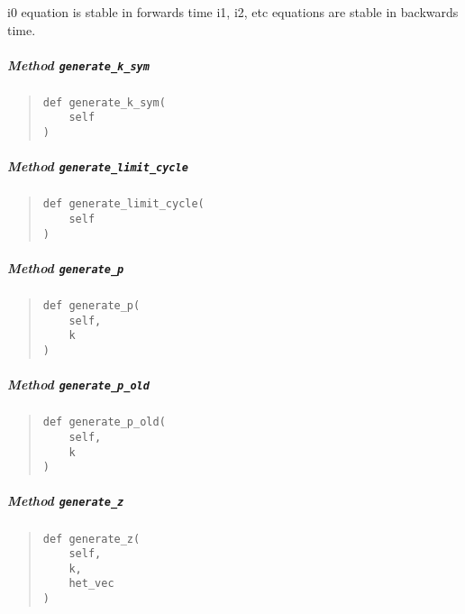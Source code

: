 \documentclass[
  english,
  a4paper,
  oneside]{article}
\begin{document}
i0 equation is stable in forwards time i1, i2, etc equations are stable
in backwards time.

\hypertarget{StrongCoupling.StrongCoupling.generate_k_sym}{%
\subparagraph{\texorpdfstring{Method
\texttt{generate\_k\_sym}}{Method generate\_k\_sym}}\label{StrongCoupling.StrongCoupling.generate_k_sym}}

\begin{quote}
\begin{verbatim}
def generate_k_sym(
    self
)
\end{verbatim}
\end{quote}

\hypertarget{StrongCoupling.StrongCoupling.generate_limit_cycle}{%
\subparagraph{\texorpdfstring{Method
\texttt{generate\_limit\_cycle}}{Method generate\_limit\_cycle}}\label{StrongCoupling.StrongCoupling.generate_limit_cycle}}

\begin{quote}
\begin{verbatim}
def generate_limit_cycle(
    self
)
\end{verbatim}
\end{quote}

\hypertarget{StrongCoupling.StrongCoupling.generate_p}{%
\subparagraph{\texorpdfstring{Method
\texttt{generate\_p}}{Method generate\_p}}\label{StrongCoupling.StrongCoupling.generate_p}}

\begin{quote}
\begin{verbatim}
def generate_p(
    self,
    k
)
\end{verbatim}
\end{quote}

\hypertarget{StrongCoupling.StrongCoupling.generate_p_old}{%
\subparagraph{\texorpdfstring{Method
\texttt{generate\_p\_old}}{Method generate\_p\_old}}\label{StrongCoupling.StrongCoupling.generate_p_old}}

\begin{quote}
\begin{verbatim}
def generate_p_old(
    self,
    k
)
\end{verbatim}
\end{quote}

\hypertarget{StrongCoupling.StrongCoupling.generate_z}{%
\subparagraph{\texorpdfstring{Method
\texttt{generate\_z}}{Method generate\_z}}\label{StrongCoupling.StrongCoupling.generate_z}}

\begin{quote}
\begin{verbatim}
def generate_z(
    self,
    k,
    het_vec
)
\end{verbatim}
\end{quote}
\end{document}
